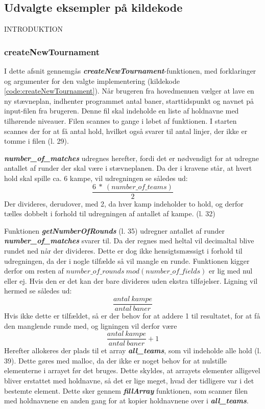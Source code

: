 \subsection*{Udvalgte eksempler på kildekode}
INTRODUKTION

\subsubsection{createNewTournament}
I dette afsnit gennemgås \textbf{\textit{createNewTournament}}-funktionen, med forklaringer og argumenter for den valgte implementering (kildekode \ref{code:createNewTournament}). 
Når brugeren fra hovedmenuen vælger at lave en ny stævneplan, indhenter programmet antal baner, starttidspunkt og navnet på input-filen fra brugeren. Denne fil skal indeholde en liste af holdnavne med tilhørende niveauer. Filen scannes to gange i løbet af funktionen. I starten scannes der for at få antal hold, hvilket også svarer til antal linjer, der ikke er tomme i filen (l. 29).
\par
\textbf{\textit{number\_of\_matches}} udregnes herefter, fordi det er nødvendigt for at udregne antallet af runder der skal være i stævneplanen. Da der i kravene står, at hvert hold skal spille ca. 6 kampe, vil udregningen se således ud:
\[\frac{6\ * \ (number\_of\_teams)}{2}\]
Der divideres, derudover, med 2, da hver kamp indeholder to hold, og derfor tælles dobbelt i forhold til udregningen af antallet af kampe. (l. 32)
\par
Funktionen \textbf{\textit{getNumberOfRounds}} (l. 35) udregner antallet af runder \textbf{\textit{number\_of\_matches}} svarer til. Da der regnes med heltal vil decimaltal blive rundet ned når der divideres. Dette er dog ikke hensigtsmæssigt i forhold til udregningen, da der i nogle tilfælde så vil mangle en runde. Funktionen kigger derfor om resten af $number\_of\_rounds \ mod(number\_of\_fields)$ er lig med nul eller ej. Hvis den er det kan der bare divideres uden ekstra tilføjelser. Ligning vil hermed se således ud:
\[\frac{antal \ kampe}{antal \ baner}\]
Hvis ikke dette er tilfældet, så er der behov for at addere 1 til resultatet, for at få den manglende runde med, og ligningen vil derfor være 
\[\frac{antal \ kampe}{antal \ baner} + 1\]
Herefter allokeres der plads til et array \textbf{\textit{all\_teams}}, som vil indeholde alle hold (l. 39). Dette gøres med malloc, da der ikke er noget behov for at nulstille elementerne i arrayet før det bruges. Dette skyldes, at arrayets elementer alligevel bliver erstattet med holdnavne, så det er lige meget, hvad der tidligere var i det bestemte element. Dette sker gennem \textbf{\textit{fillArray}} funktionen, som scanner filen med holdnavnene en anden gang for at kopier holdnavnene over i \textbf{\textit{all\_teams}}.
